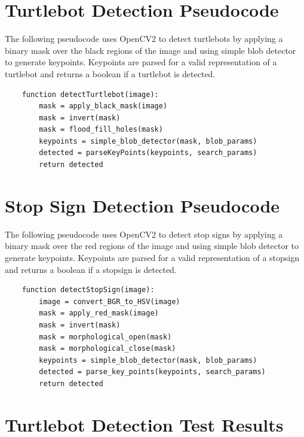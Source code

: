 \documentclass[11pt]{article}
\begin{document}

\begin{appendices}

\section{Turtlebot Detection Pseudocode}
\label{app:detect_turtlebot}

    The following pseudocode uses OpenCV2 to detect turtlebots by applying a binary mask over the black regions of the image and using simple blob detector to generate keypoints. Keypoints are parsed for a valid representation of a turtlebot and returns a boolean if a turtlebot is detected.

    \begin{verbatim}
    function detectTurtlebot(image):
        mask = apply_black_mask(image)
        mask = invert(mask)
        mask = flood_fill_holes(mask)
        keypoints = simple_blob_detector(mask, blob_params)
        detected = parseKeyPoints(keypoints, search_params)
        return detected
    \end{verbatim}

\section{Stop Sign Detection Pseudocode}
\label{app:detect_stop}

    The following pseudocode uses OpenCV2 to detect stop signs by applying a binary mask over the red regions of the image and using simple blob detector to generate keypoints. Keypoints are parsed for a valid representation of a stopsign and returns a boolean if a stopsign is detected.

    \begin{verbatim}
    function detectStopSign(image):
        image = convert_BGR_to_HSV(image)
        mask = apply_red_mask(image)
        mask = invert(mask)
        mask = morphological_open(mask)
        mask = morphological_close(mask)
        keypoints = simple_blob_detector(mask, blob_params)
        detected = parse_key_points(keypoints, search_params)
        return detected
    \end{verbatim}

\section{Turtlebot Detection Test Results}
\label{app:detect_turtlebot_results}


\end{appendices}
\end{document}
